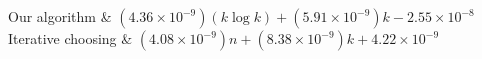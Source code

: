 Our algorithm & \((4.36 \times 10^{-9})(k \log k) + (5.91 \times 10^{-9})k - 2.55 \times 10^{-8}\)\\
Iterative choosing & \((4.08 \times 10^{-9})n + (8.38 \times 10^{-9})k + 4.22 \times 10^{-9}\)\\
